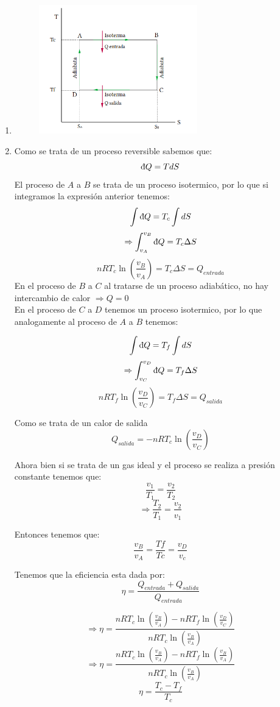 \begin{enumerate}
   \item \begin{figure}[H]
            \centering
            \includegraphics[width=0.65\textwidth]{T-S.png}
         \end{figure}
   \item  Como se trata de un proceso reversible  sabemos que:
         \[ \dbar Q =TdS \]
         El proceso de $A$ a $B$ se trata de un proceso isotermico, por lo que si integramos la expresión anterior tenemos:
         \[ \int \dbar Q =T_{c}\int dS \]
         \[ \Rightarrow \int _{v_A} ^{v_B} \dbar Q = T_{c} \Delta S\]
         \[nRT_c \ln \left( \frac{v_B}{v_A}\right) = T_{c}\Delta S = Q_{entrada}\]
         En el proceso de $B$ a $C$ al tratarse de un proceso adiabático, no hay intercambio de calor $\Rightarrow Q=0$\\

         En  el proceso de $C$ a $D$ tenemos un proceso isotermico, por lo que analogamente al proceso de $A$ a $B$ tenemos:

         \[ \int \dbar Q =T_{f}\int dS \]
         \[ \Rightarrow \int _{v_C} ^{v_D} \dbar Q = T_{f} \Delta S\]
         \[nRT_f \ln \left( \frac{v_D}{v_C}\right) = T_{f}\Delta S = Q_{salida}\]

         Como se trata de un calor de salida
         \[Q_{salida}=-nRT_c \ln \left( \frac{v_D}{v_C}\right)\]


         Ahora bien si  se trata de un gas ideal y el proceso se realiza a presión constante tenemos que:
         \[ \frac{v_1}{T_1}=\frac{v_2}{T_2}\]
         \[\Rightarrow \frac{T_2}{T_1}=\frac{v_2}{v_1}\]

         Entonces tenemos que:
         \[ \frac{v_B}{v_A}=\frac{Tf}{Tc}=\frac{v_D}{v_c}\]

         Tenemos que la eficiencia esta dada por:
         \[ \eta = \frac{Q_{entrada}+ Q_{salida}}{Q_{entrada}}\]

         \[\Rightarrow  \eta = \frac{nRT_c \ln \left( \frac{v_B}{v_A}\right)-nRT_f \ln \left( \frac{v_D}{v_C}\right)}{nRT_c \ln \left( \frac{v_B}{v_A}\right)}\]
         \[\Rightarrow  \eta = \frac{nRT_c \ln \left( \frac{v_B}{v_A}\right)-nRT_f \ln \left( \frac{v_B}{v_A}\right)}{nRT_c \ln \left( \frac{v_B}{v_A}\right)}\]
         \[\eta =\frac{T_c-T_f}{T_c}\]





\end{enumerate}
